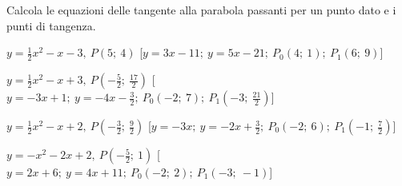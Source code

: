 \begin{esercizio}\label{ese:}
 Calcola le equazioni delle tangente alla parabola passanti per un punto 
 dato e i punti di tangenza.
 \begin{enumeratea}
  \item  $y=\frac{1}{2} x^2 - x -3,~P \left (5;~4 \right )$
   \hfill [$y = 3 x -11;~y = 5 x -21;~P_0 \left (4;~1 \right );~P_1 \left (6;~9 \right )$]
  \item  $y=\frac{1}{2} x^2 - x +3,~P \left (-\frac{5}{2};~\frac{17}{2} \right )$
   \hfill [$y = -3 x +1;~y = -4 x -\frac{3}{2};~P_0 \left (-2;~7 \right );~P_1 \left (-3;~\frac{21}{2} \right )$]
  \item  $y=\frac{1}{2} x^2 - x +2,~P \left (-\frac{3}{2};~\frac{9}{2} \right )$
   \hfill [$y = -3 x ;~y = -2 x +\frac{3}{2};~P_0 \left (-2;~6 \right );~P_1 \left (-1;~\frac{7}{2} \right )$]
  \item  $y=- x^2 -2 x +2,~P \left (-\frac{5}{2};~1 \right )$
   \hfill [$y = 2 x +6;~y = 4 x +11;~P_0 \left (-2;~2 \right );~P_1 \left (-3;~-1 \right )$]

\end{enumeratea}
\end{esercizio}
